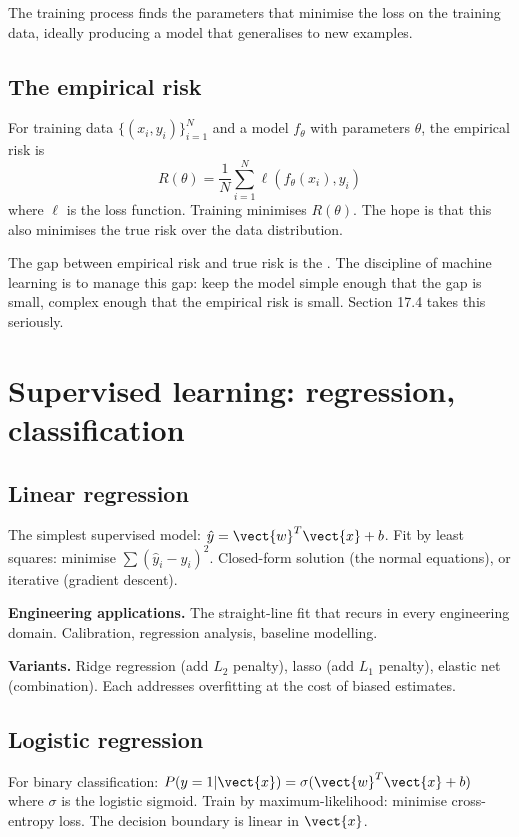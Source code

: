 The training process finds the parameters that minimise the loss on the training data, ideally producing a model that generalises to new examples.

\subsection{The empirical risk}

For training data $\{(x_i, y_i)\}_{i=1}^N$ and a model $f_\theta$ with parameters $\theta$, the empirical risk is
\[
R(\theta) = \frac{1}{N} \sum_{i=1}^N \ell(f_\theta(x_i), y_i)
\]
where $\ell$ is the loss function. Training minimises $R(\theta)$. The hope is that this also minimises the true risk over the data distribution.

The gap between empirical risk and true risk is the . The discipline of machine learning is to manage this gap: keep the model simple enough that the gap is small, complex enough that the empirical risk is small. Section 17.4 takes this seriously.

\section{Supervised learning: regression, classification}

\subsection{Linear regression}

The simplest supervised model: $\hat{y} = \vect{w}^T \vect{x} + b$. Fit by least squares: minimise $\sum (\hat{y}_i - y_i)^2$. Closed-form solution (the normal equations), or iterative (gradient descent).

\textbf{Engineering applications.} The straight-line fit that recurs in every engineering domain. Calibration, regression analysis, baseline modelling.

\textbf{Variants.} Ridge regression (add $L_2$ penalty), lasso (add $L_1$ penalty), elastic net (combination). Each addresses overfitting at the cost of biased estimates.

\subsection{Logistic regression}

For binary classification: $P(y = 1 | \vect{x}) = \sigma(\vect{w}^T \vect{x} + b)$ where $\sigma$ is the logistic sigmoid. Train by maximum-likelihood: minimise cross-entropy loss. The decision boundary is linear in $\vect{x}$.

